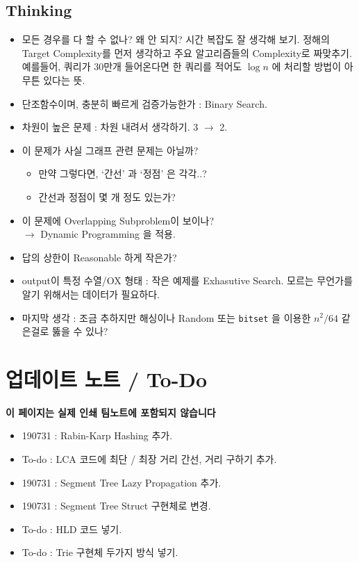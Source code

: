 \documentclass[landscape,8pt]{article}
\begin{document}
\begin{multicols}{2}
  \subsection{Thinking}
    \begin{itemize}
      \item 모든 경우를 다 할 수 없나? 왜 안 되지? 시간 복잡도 잘 생각해 보기. 정해의 Target Complexity를 먼저 생각하고 주요 알고리즘들의 Complexity로 짜맞추기.\\
      예를들어, 쿼리가 30만개 들어온다면 한 쿼리를 적어도 $\log{n}$ 에 처리할 방법이 아무튼 있다는 뜻.
      \item 단조함수이며, 충분히 빠르게 검증가능한가 : Binary Search.
      \item 차원이 높은 문제 : 차원 내려서 생각하기. 3 $\rightarrow$ 2.
      \item 이 문제가 사실 그래프 관련 문제는 아닐까?
        \begin{itemize}
          \item 만약 그렇다면, `간선' 과 `정점' 은 각각..?
          \item 간선과 정점이 몇 개 정도 있는가?
        \end{itemize}
      \item 이 문제에 Overlapping Subproblem이 보이나? \\$\rightarrow$ Dynamic Programming 을 적용.
      \item 답의 상한이 Reasonable 하게 작은가?
      \item output이 특정 수열/OX 형태 : 작은 예제를 Exhasutive Search. 모르는 무언가를 알기 위해서는 데이터가 필요하다.
      \item 마지막 생각 : 조금 추하지만 해싱이나 Random 또는 \texttt{bitset} 을 이용한 $n^2 / 64$ 같은걸로 뚫을 수 있나?
    \end{itemize}
\newpage
\section*{업데이트 노트 / To-Do}
\textbf{이 페이지는 실제 인쇄 팀노트에 포함되지 않습니다}
\begin{itemize}
  \item 190731 : Rabin-Karp Hashing 추가.
  \item To-do : LCA 코드에 최단 / 최장 거리 간선, 거리 구하기 추가.
  \item 190731 : Segment Tree Lazy Propagation 추가.
  \item 190731 : Segment Tree Struct 구현체로 변경.
  \item To-do : HLD 코드 넣기.
  \item To-do : Trie 구현체 두가지 방식 넣기.
\columnbreak
\end{itemize}
\end{multicols}
\end{document}
